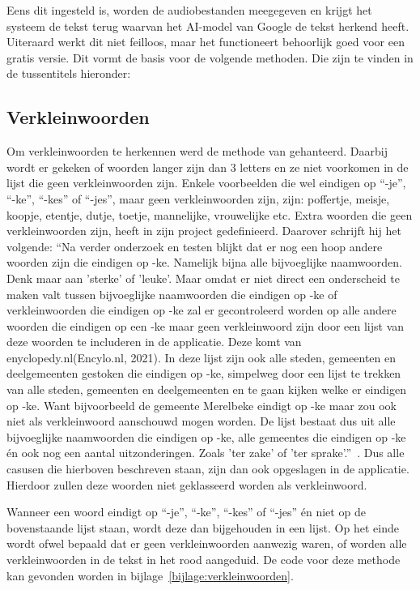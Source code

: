 Eens dit ingesteld is, worden de audiobestanden meegegeven en krijgt het systeem de tekst terug waarvan het AI-model van Google de tekst herkend heeft. Uiteraard werkt dit niet feilloos, maar  het functioneert behoorlijk goed voor een gratis versie. Dit vormt de basis voor de volgende methoden. Die zijn te vinden in de tussentitels hieronder:

\subsection{Verkleinwoorden}
Om verkleinwoorden te herkennen werd de methode van \textcite{Standaert2021} gehanteerd. Daarbij wordt er gekeken of woorden langer zijn dan 3 letters en ze niet voorkomen in de lijst die geen verkleinwoorden zijn. Enkele voorbeelden die wel eindigen op ``-je'', ``-ke'', ``-kes'' of ``-jes'', maar geen verkleinwoorden zijn, zijn: poffertje, meisje, koopje, etentje, dutje, toetje, mannelijke, vrouwelijke etc. Extra woorden die geen verkleinwoorden zijn, heeft \textcite{Standaert2021} in zijn project gedefinieerd. Daarover schrijft hij het volgende:
``Na verder onderzoek en testen blijkt dat er nog een hoop andere woorden zijn die eindigen
op -ke. Namelijk bijna alle bijvoeglijke naamwoorden. Denk maar aan ’sterke’ of ’leuke’.
Maar omdat er niet direct een onderscheid te maken valt tussen bijvoeglijke naamwoorden
die eindigen op -ke of verkleinwoorden die eindigen op -ke zal er gecontroleerd worden op
alle andere woorden die eindigen op een -ke maar geen verkleinwoord zijn door een lijst
van deze woorden te includeren in de applicatie. Deze komt van enyclopedy.nl(Encylo.nl,
2021). In deze lijst zijn ook alle steden, gemeenten en deelgemeenten gestoken die eindigen
op -ke, simpelweg door een lijst te trekken van alle steden, gemeenten en deelgemeenten
en te gaan kijken welke er eindigen op -ke. Want bijvoorbeeld de gemeente Merelbeke
eindigt op -ke maar zou ook niet als verkleinwoord aanschouwd mogen worden. De lijst
bestaat dus uit alle bijvoeglijke naamwoorden die eindigen op -ke, alle gemeentes die
eindigen op -ke én ook nog een aantal uitzonderingen. Zoals ’ter zake’ of ’ter sprake’.''~\autocite{Standaert2021}. Dus alle casusen die hierboven beschreven staan, zijn dan ook opgeslagen in de applicatie. Hierdoor zullen deze woorden niet geklasseerd worden als verkleinwoord.

Wanneer een woord eindigt op ``-je'', ``-ke'', ``-kes'' of ``-jes'' én niet op de bovenstaande lijst staan, wordt deze dan bijgehouden in een lijst. Op het einde wordt ofwel bepaald dat er geen verkleinwoorden aanwezig waren, of worden alle verkleinwoorden in de tekst in het rood aangeduid. De code voor deze methode kan gevonden worden in bijlage~\ref{bijlage:verkleinwoorden}.

